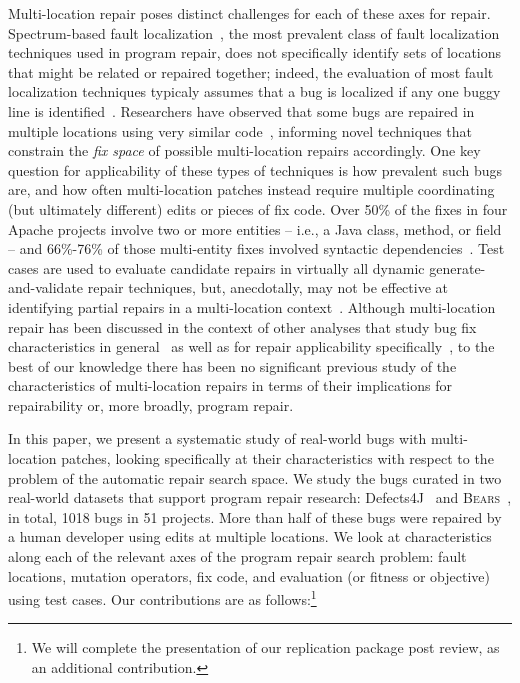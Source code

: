 \documentclass[10pt, conference]{IEEEtran}
\newcommand\bears{\textsc{Bears}\xspace}
\begin{document}
Multi-location repair poses distinct challenges for each of these axes for repair.
Spectrum-based fault localization~\cite{ochiai}, the most prevalent class of
fault localization techniques used in program repair, does not specifically
identify sets of locations that might be related or repaired together; indeed,
the evaluation of most fault localization techniques typicaly assumes that a bug
is localized if any one buggy line is identified~\cite{fl-survey-wong}.
Researchers have observed that some bugs are
repaired in multiple locations using very similar
code~\cite{saha2019harnessing,jiang2019cmsuggester}, informing novel techniques
that constrain the \emph{fix space} of possible multi-location repairs accordingly.
One key question for applicability of these types of techniques is how prevalent
such bugs are, and how often multi-location patches instead require multiple
coordinating (but ultimately different) edits or pieces of fix code.  Over 50\% of the fixes in four 
Apache projects involve two or more entities -- i.e., a Java class, method, or field -- and 66\%-76\% of 
those multi-entity fixes involved syntactic dependencies~\cite{wang2018}. 
Test cases are used to evaluate candidate repairs in virtually all dynamic
generate-and-validate repair techniques, but, anecdotally, may not be effective
at identifying partial repairs in a multi-location
context~\cite{better-fitness}.  
Although multi-location repair has been discussed in the context of other analyses
that study bug fix characteristics in general~\cite{d4j-dissection} as well as for
repair applicability specifically~\cite{zhong2015, wang2018}, to the best of our
knowledge there has been no significant previous study of the characteristics of
multi-location repairs in terms of their implications for repairability or, more
broadly, program repair.  

In this paper, we present a systematic study of real-world bugs with
multi-location patches,
looking specifically at their characteristics with respect to the problem of the
automatic repair search space.  
We study the bugs curated in two
real-world datasets that support program repair research: Defects4J~\cite{defects4j}
and \bears~\cite{bears}, in total, 1018 bugs in 51 projects.
More than half of these bugs were repaired by a
human developer using edits at multiple locations.  We look at characteristics along each of the
relevant axes of the program repair search problem: fault locations, mutation
operators, fix code, and evaluation (or fitness or objective) using test cases.  Our 
contributions are
as follows:\footnote{We will complete the presentation of our replication package post review, as an additional contribution.}
\end{document}

